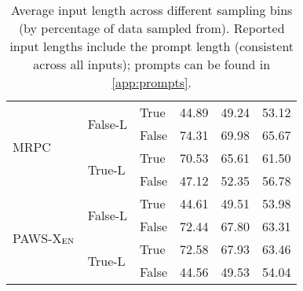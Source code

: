 \begin{table*}[h!]
\begin{tabular}{llllll}
  \midrule
  \multirow{4}{*}{MRPC} & \multirow{2}{*}{False-L} & True & 44.89 & 49.24 & 53.12\\
  \cmidrule{3-6}
  & & False & 74.31 & 69.98 & 65.67\\
  \cmidrule{2-6}
  & \multirow{2}{*}{True-L} & True & 70.53 & 65.61 & 61.50\\
  \cmidrule{3-6}
  & & False & 47.12 & 52.35 & 56.78\\  
  \midrule
  \multirow{4}{*}{PAWS-X$_{\textsc{EN}}$} & \multirow{2}{*}{False-L} & True & 44.61 & 49.51 & 53.98\\
  \cmidrule{3-6}
  & & False & 72.44 & 67.80 & 63.31\\
  \cmidrule{2-6}
  & \multirow{2}{*}{True-L} & True & 72.58 & 67.93 & 63.46\\
  \cmidrule{3-6}
  & & False & 44.56 & 49.53 & 54.04\\  

\bottomrule
\end{tabular}%
\caption{Average input length across different sampling bins (by percentage of data sampled from). Reported input lengths include the prompt length (consistent across all inputs); prompts can be found in \autoref{app:prompts}. \label{table:avg_len_diff}}
\end{table*}
